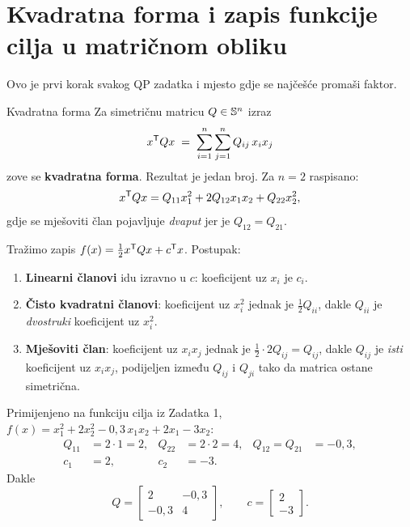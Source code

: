 \section{Kvadratna forma i zapis funkcije cilja u matričnom obliku}
\label{sec:kvadratna-forma}

Ovo je prvi korak svakog QP zadatka i mjesto gdje se najčešće promaši faktor.

\begin{pojam}{Kvadratna forma}
Za simetričnu matricu $Q \in \mathbb{S}^{n}$ izraz
\begin{equation}
x^{\mathsf{T}} Q x \;=\; \sum_{i=1}^{n}\sum_{j=1}^{n} Q_{ij}\, x_i x_j
\end{equation}
zove se \textbf{kvadratna forma}. Rezultat je jedan broj. Za $n = 2$ raspisano:
\begin{equation}
x^{\mathsf{T}} Q x = Q_{11}x_1^2 + 2Q_{12}x_1x_2 + Q_{22}x_2^2 ,
\label{eq:kv-forma-2d}
\end{equation}
gdje se mješoviti član pojavljuje \emph{dvaput} jer je $Q_{12} = Q_{21}$.
\end{pojam}

\begin{korak}
Tražimo zapis $f(x) = \tfrac{1}{2} x^{\mathsf{T}} Q x + c^{\mathsf{T}} x$. Postupak:
\begin{enumerate}[leftmargin=*]
  \item \textbf{Linearni članovi} idu izravno u $c$: koeficijent uz $x_i$ je $c_i$.
  \item \textbf{Čisto kvadratni članovi}: koeficijent uz $x_i^2$ jednak je
        $\tfrac{1}{2}Q_{ii}$, dakle $Q_{ii}$ je \emph{dvostruki} koeficijent uz $x_i^2$.
  \item \textbf{Mješoviti član}: koeficijent uz $x_i x_j$ jednak je
        $\tfrac{1}{2}\cdot 2 Q_{ij} = Q_{ij}$, dakle $Q_{ij}$ je \emph{isti}
        koeficijent uz $x_ix_j$, podijeljen između $Q_{ij}$ i $Q_{ji}$ tako da
        matrica ostane simetrična.
\end{enumerate}
\end{korak}

Primijenjeno na funkciju cilja iz Zadatka 1,
$f(x) = x_1^2 + 2x_2^2 - 0{,}3\,x_1x_2 + 2x_1 - 3x_2$:
\begin{align}
Q_{11} &= 2 \cdot 1 = 2, &
Q_{22} &= 2 \cdot 2 = 4, &
Q_{12} = Q_{21} &= -0{,}3, \\
c_1 &= 2, &
c_2 &= -3. & &
\end{align}
Dakle
\begin{equation}
Q = \begin{bmatrix} 2 & -0{,}3 \\ -0{,}3 & 4 \end{bmatrix}, \qquad
c = \begin{bmatrix} 2 \\ -3 \end{bmatrix}.
\label{eq:alat-Q-c}
\end{equation}

